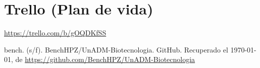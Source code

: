 \documentclass[12pt]{article}
\begin{document}
\section*{Trello (Plan de vida)}

\begin{center}
	\url{https://trello.com/b/gOQDKfSS}
\end{center}



\begin{thebibliography}{X}
	
	 bench. (s/f). BenchHPZ/UnADM-Biotecnologia. GitHub. Recuperado el \today, de \url{https://github.com/BenchHPZ/UnADM-Biotecnologia}

\end{thebibliography}
\end{document}

